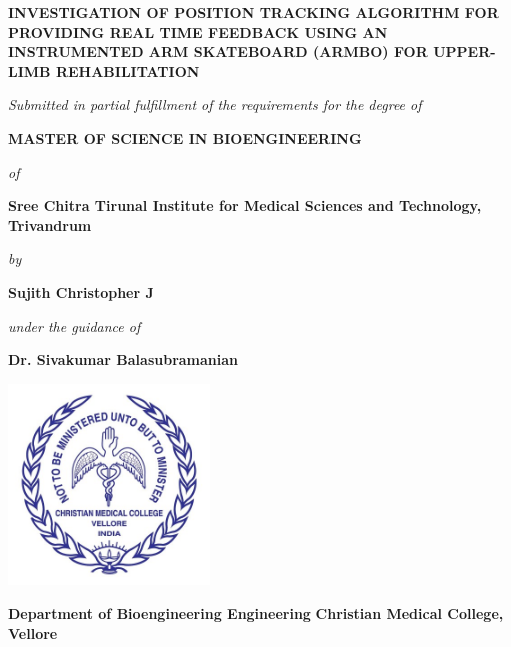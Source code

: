\documentclass[12pt, twoside]{report}
\begin{document}
\begin{center}
    \Large \textbf{INVESTIGATION OF POSITION TRACKING ALGORITHM FOR PROVIDING REAL TIME FEEDBACK USING 
    AN INSTRUMENTED ARM SKATEBOARD (ARMBO) FOR UPPER-LIMB REHABILITATION}

    

    \vspace{0.5cm}
    \textit{Submitted in partial fulfillment of the requirements for the degree of} 

    \vspace{0.5cm}

    \textbf{MASTER OF SCIENCE IN BIOENGINEERING}

    \vspace{0.5cm}

    \textit{of}

    \vspace{0.5cm}

    \textbf{Sree Chitra Tirunal Institute for Medical Sciences and Technology, Trivandrum}

    \vspace{0.5cm}

    \textit{by}

    \vspace{0.5cm}

    \textbf{Sujith Christopher J}

    \vspace{0.5cm}

    \textit{under the guidance of}

    \vspace{0.5cm}

    \textbf{Dr. Sivakumar Balasubramanian}

    \vspace{0.5cm}

    \includegraphics[width=0.4\textwidth]{f_logo.jpg}

    \vspace{0.1cm}

    \textbf{Department of Bioengineering Engineering}
    \textbf{Christian Medical College, Vellore}


\end{center}
\end{document}

